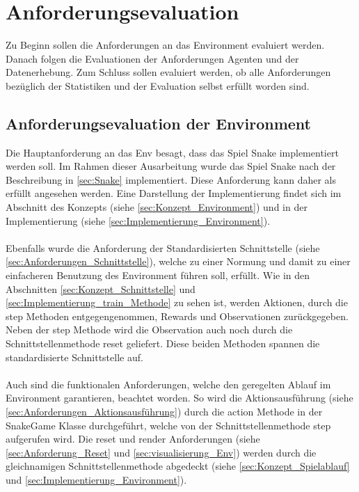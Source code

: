 \section{Anforderungsevaluation}
Zu Beginn sollen die Anforderungen an das Environment evaluiert werden. Danach folgen die Evaluationen der Anforderungen Agenten und der Datenerhebung. Zum Schluss sollen evaluiert werden, ob alle Anforderungen bezüglich der Statistiken und der Evaluation selbst erfüllt worden sind.

\subsection{Anforderungsevaluation der Environment}
Die Hauptanforderung an das Env besagt, dass das Spiel Snake implementiert werden soll. Im Rahmen dieser Ausarbeitung wurde das Spiel Snake nach der Beschreibung in \ref{sec:Snake} implementiert. Diese Anforderung kann daher als erfüllt angesehen werden. Eine Darstellung der Implementierung findet sich im Abschnitt des Konzepts (siehe \ref{sec:Konzept_Environment}) und in der Implementierung (siehe \ref{sec:Implementierung_Environment}).\\
\\ Ebenfalls wurde die Anforderung der Standardisierten Schnittstelle (siehe \ref{sec:Anforderungen_Schnittstelle}), welche zu einer Normung und damit zu einer einfacheren Benutzung des Environment führen soll, erfüllt. Wie in den Abschnitten \ref{sec:Konzept_Schnittstelle} und \ref{sec:Implementierung_train_Methode} zu sehen ist, werden Aktionen, durch die step Methoden entgegengenommen, Rewards und Observationen zurückgegeben. Neben der step Methode wird die Observation auch noch durch die Schnittstellenmethode reset geliefert. Diese beiden Methoden spannen die standardisierte Schnittstelle auf.\\
\\ Auch sind die funktionalen Anforderungen, welche den geregelten Ablauf im Environment garantieren, beachtet worden.
So wird die Aktionsausführung (siehe \ref{sec:Anforderungen_Aktionsausführung}) durch die action Methode in der SnakeGame Klasse durchgeführt, welche von der Schnittstellenmethode step aufgerufen wird. Die reset und render Anforderungen (siehe \ref{sec:Anforderung_Reset} und \ref{sec:visualisierung_Env}) werden durch die gleichnamigen Schnittstellenmethode abgedeckt (siehe \ref{sec:Konzept_Spielablauf} und \ref{sec:Implementierung_Environment}).

